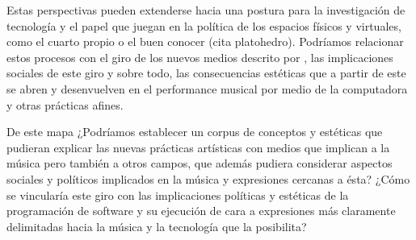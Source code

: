 Estas perspectivas pueden extenderse hacia una postura para la investigación de tecnología y el papel que juegan en la política de los espacios físicos y virtuales, como el cuarto propio \citep{cuartopropio} o el buen conocer (cita platohedro). Podríamos relacionar estos procesos con el giro de los nuevos medios descrito por \cite{manovichlanguage}, las implicaciones sociales de este giro y sobre todo, las consecuencias estéticas que a partir de este se abren y desenvuelven en el performance musical por medio de la computadora y otras prácticas afines. 

De este mapa ¿Podríamos establecer un corpus de conceptos y estéticas \citep{shankenCanon} que pudieran explicar las nuevas prácticas artísticas con medios que implican a la música pero también a otros campos, que además pudiera considerar aspectos sociales y políticos implicados en la música y expresiones cercanas a ésta? ¿Cómo se vincularía este giro con las implicaciones políticas y estéticas de la programación de software y su ejecución \citep{speakingCode} de cara a expresiones más claramente delimitadas hacia la música y la tecnología que la posibilita?

\iffalse

- manifiestos y posturas políticas > live coding y servidora feminista 
- Diferencias con respecto a otros espacios
- Discusión sobre lo digital, los nuevos medios y la virtualidad. 
- Giro de los nuevos medios
- Agotamiento del formato
- funcionalidad - experimentación 
- Arqueología en internet (cosas que ya tienen tiempo y cosas recientes). 
- El papel de los videojuegos gamización
- Lo barroco y el artículo de electroacústica. 
- Espacio, arquitectura e integración: puede el espacio virtual convertirse en un objeto con agencia en la interpretacion en vivo? 

\fi
